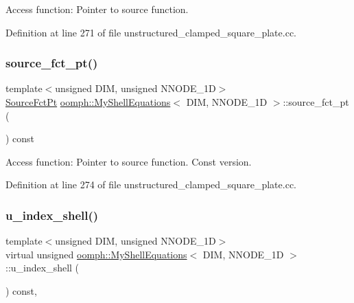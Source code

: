 Access function\+: Pointer to source function. 



Definition at line 271 of file unstructured\+\_\+clamped\+\_\+square\+\_\+plate.\+cc.

\mbox{\label{classoomph_1_1MyShellEquations_a3cf0287a7fcc34f88c011805ae18fdcb}} 
\subsubsection{\texorpdfstring{source\+\_\+fct\+\_\+pt()}{source\_fct\_pt()}\hspace{0.1cm}{\footnotesize\ttfamily [2/2]}}
{\footnotesize\ttfamily template$<$unsigned D\+IM, unsigned N\+N\+O\+D\+E\+\_\+1D$>$ \\
\hyperlink{classoomph_1_1MyShellEquations_a056d2488b6e65787f5c9935a321b7a9b}{Source\+Fct\+Pt} \hyperlink{classoomph_1_1MyShellEquations}{oomph\+::\+My\+Shell\+Equations}$<$ D\+IM, N\+N\+O\+D\+E\+\_\+1D $>$\+::source\+\_\+fct\+\_\+pt (\begin{DoxyParamCaption}{ }\end{DoxyParamCaption}) const\hspace{0.3cm}{\ttfamily [inline]}}



Access function\+: Pointer to source function. Const version. 



Definition at line 274 of file unstructured\+\_\+clamped\+\_\+square\+\_\+plate.\+cc.

\mbox{\label{classoomph_1_1MyShellEquations_a983c9be2c162eccec2f41c391722f0aa}} 
\subsubsection{\texorpdfstring{u\+\_\+index\+\_\+shell()}{u\_index\_shell()}}
{\footnotesize\ttfamily template$<$unsigned D\+IM, unsigned N\+N\+O\+D\+E\+\_\+1D$>$ \\
virtual unsigned \hyperlink{classoomph_1_1MyShellEquations}{oomph\+::\+My\+Shell\+Equations}$<$ D\+IM, N\+N\+O\+D\+E\+\_\+1D $>$\+::u\+\_\+index\+\_\+shell (\begin{DoxyParamCaption}{ }\end{DoxyParamCaption}) const\hspace{0.3cm}{\ttfamily [inline]}, {\ttfamily [virtual]}}



